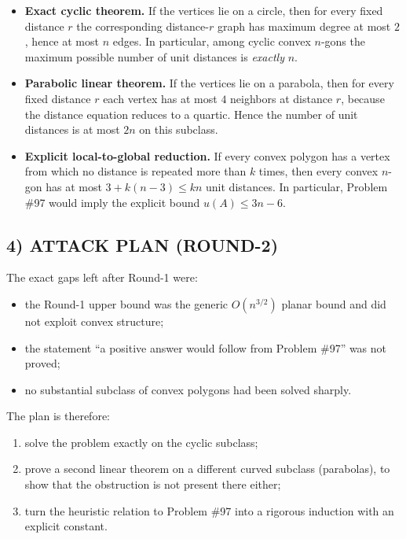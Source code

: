 \begin{itemize}
\item \textbf{Exact cyclic theorem.} If the vertices lie on a circle, then for every fixed distance $r$ the corresponding distance-$r$ graph has maximum degree at most $2$, hence at most $n$ edges. In particular, among cyclic convex $n$-gons the maximum possible number of unit distances is \emph{exactly} $n$.
\item \textbf{Parabolic linear theorem.} If the vertices lie on a parabola, then for every fixed distance $r$ each vertex has at most $4$ neighbors at distance $r$, because the distance equation reduces to a quartic. Hence the number of unit distances is at most $2n$ on this subclass.
\item \textbf{Explicit local-to-global reduction.} If every convex polygon has a vertex from which no distance is repeated more than $k$ times, then every convex $n$-gon has at most $3+k(n-3)\le kn$ unit distances. In particular, Problem \#97 would imply the explicit bound $u(A)\le 3n-6$.
\end{itemize}

\subsection*{4) ATTACK PLAN (ROUND-2)}

The exact gaps left after Round-1 were:

\begin{itemize}
\item the Round-1 upper bound was the generic $O(n^{3/2})$ planar bound and did not exploit convex structure;
\item the statement ``a positive answer would follow from Problem \#97'' was not proved;
\item no substantial subclass of convex polygons had been solved sharply.
\end{itemize}

The plan is therefore:

\begin{enumerate}
\item solve the problem exactly on the cyclic subclass;
\item prove a second linear theorem on a different curved subclass (parabolas), to show that the obstruction is not present there either;
\item turn the heuristic relation to Problem \#97 into a rigorous induction with an explicit constant.
\end{enumerate}

